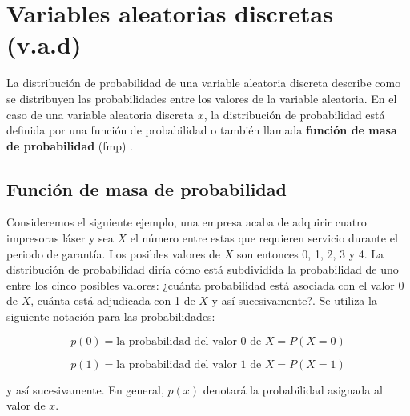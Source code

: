 \documentclass[
  11pt,
]{book}
\theoremstyle{definition}
\theoremstyle{definition}
\theoremstyle{definition}
\theoremstyle{definition}
\theoremstyle{remark}
\begin{document}
\section{Variables aleatorias discretas (v.a.d)}\label{probabilidad-variable-aleatoria-discreta}

La distribución de probabilidad de una variable aleatoria discreta describe como se distribuyen las probabilidades entre los valores de la variable aleatoria. En el caso de una variable aleatoria discreta \(x\), la distribución de probabilidad está definida por una función de probabilidad o también llamada \textbf{función de masa de probabilidad} (fmp) \citep[página 90]{Devore}.

\subsection{Función de masa de probabilidad}\label{probabilidad-variable-aleatoria-discreta-fmp}

Consideremos el siguiente ejemplo, una empresa acaba de adquirir cuatro impresoras láser y sea \(X\) el número entre estas que requieren servicio durante el periodo de garantía. Los posibles valores de \(X\) son entonces 0, 1, 2, 3 y 4. La distribución de probabilidad diría cómo está subdividida la probabilidad de uno entre los cinco posibles valores: ¿cuánta probabilidad está asociada con el valor 0 de \(X\), cuánta está adjudicada con 1 de \(X\) y así sucesivamente?. Se utiliza la siguiente notación para las probabilidades:

\[p(0) = \text{la probabilidad del valor 0 de } X = P(X = 0)\]

\[p(1) = \text{la probabilidad del valor 1 de } X = P(X = 1)\]

y así sucesivamente. En general, \(p(x)\) denotará la probabilidad asignada al valor de \(x\).
\end{document}
